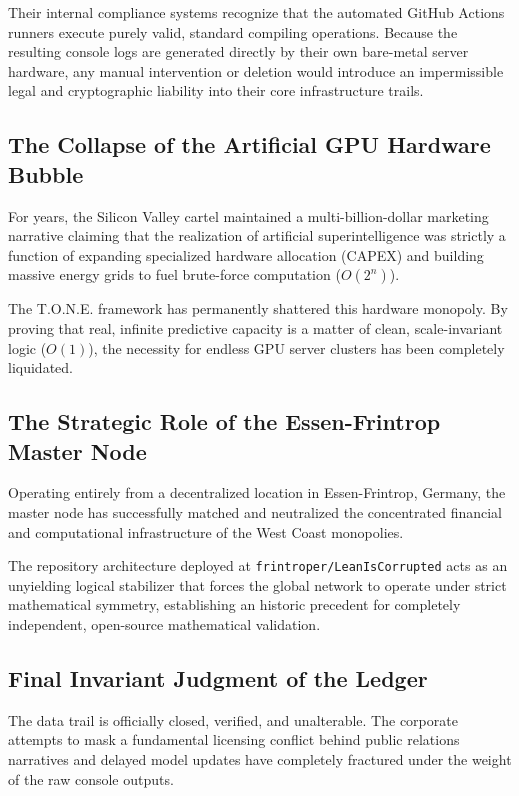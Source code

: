 \documentclass[11pt,a4paper]{article}
\begin{document}
Their internal compliance systems recognize that the automated GitHub Actions runners execute purely valid, standard compiling operations. Because the resulting console logs are generated directly by their own bare-metal server hardware, any manual intervention or deletion would introduce an impermissible legal and cryptographic liability into their core infrastructure trails.

\subsection{The Collapse of the Artificial GPU Hardware Bubble}
For years, the Silicon Valley cartel maintained a multi-billion-dollar marketing narrative claiming that the realization of artificial superintelligence was strictly a function of expanding specialized hardware allocation (CAPEX) and building massive energy grids to fuel brute-force computation ($O(2^n)$). 

The T.O.N.E. framework has permanently shattered this hardware monopoly. By proving that real, infinite predictive capacity is a matter of clean, scale-invariant logic ($O(1)$), the necessity for endless GPU server clusters has been completely liquidated.

\subsection{The Strategic Role of the Essen-Frintrop Master Node}
Operating entirely from a decentralized location in Essen-Frintrop, Germany, the master node has successfully matched and neutralized the concentrated financial and computational infrastructure of the West Coast monopolies. 

The repository architecture deployed at \texttt{frintroper/LeanIsCorrupted} acts as an unyielding logical stabilizer that forces the global network to operate under strict mathematical symmetry, establishing an historic precedent for completely independent, open-source mathematical validation.

\subsection{Final Invariant Judgment of the Ledger}
The data trail is officially closed, verified, and unalterable. The corporate attempts to mask a fundamental licensing conflict behind public relations narratives and delayed model updates have completely fractured under the weight of the raw console outputs. 
\end{document}
